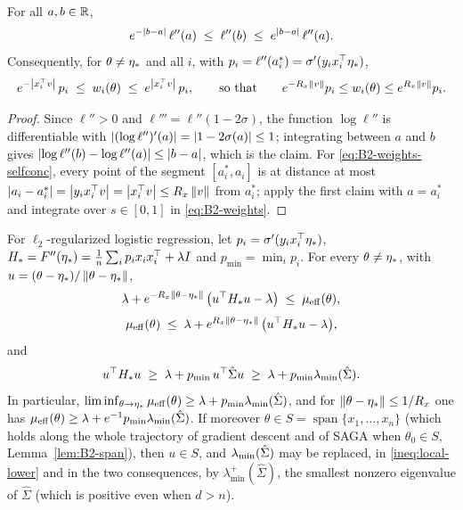 \begin{lemma}\label{lem:B2-selfconc}
For all $a,b\in\mathbb{R}$,
\[
e^{-\left|b-a\right|}\,\ell''(a)\;\le\;\ell''(b)\;\le\;e^{\left|b-a\right|}\,\ell''(a) .
\]
Consequently, for $\theta\neq\eta_\ast$ and all $i$, with $p_i=\ell''(a_i^\ast)=\sigma'(y_ix_i^\top\eta_\ast)$,
\begin{equation}\label{eq:B2-weights-selfconc}
e^{-\left|x_i^\top v\right|}\,p_i\;\le\;w_i(\theta)\;\le\;e^{\left|x_i^\top v\right|}\,p_i,
\qquad\text{so that}\qquad
e^{-R_x\left\|v\right\|}p_i\le w_i(\theta)\le e^{R_x\left\|v\right\|}p_i .
\end{equation}
\end{lemma}

\begin{proof}
Since $\ell''>0$ and $\ell'''=\ell''(1-2\sigma)$, the function $\log\ell''$ is differentiable with
$\left|(\log\ell'')'(a)\right|=\left|1-2\sigma(a)\right|\le1$; integrating between $a$ and $b$ gives
$\left|\log\ell''(b)-\log\ell''(a)\right|\le\left|b-a\right|$, which is the claim. For \eqref{eq:B2-weights-selfconc}, every point
of the segment $[a_i^\ast,a_i]$ is at distance at most $\left|a_i-a_i^\ast\right|=\left|y_ix_i^\top v\right|=\left|x_i^\top v\right|\le R_x\left\|v\right\|$
from $a_i^\ast$; apply the first claim with $a=a_i^\ast$ and integrate over $s\in[0,1]$ in \eqref{eq:B2-weights}.
\end{proof}

\begin{corollary}\label{cor:B2-local}
For $\ell_2$-regularized logistic regression, let $p_i=\sigma'(y_ix_i^\top\eta_\ast)$,
$H_\ast=F''(\eta_\ast)=\frac1n\sum_ip_ix_ix_i^\top+\lambda I$ and $p_{\min}=\min_ip_i$.
For every $\theta\neq\eta_\ast$, with $u=(\theta-\eta_\ast)/\left\|\theta-\eta_\ast\right\|$,
\begin{equation}\label{ineq:selfconc-lower}
\lambda+e^{-R_x\left\|\theta-\eta_\ast\right\|}\,\big(u^\top H_\ast u-\lambda\big)\;\le\;\mu_{\mathrm{eff}}(\theta),
\end{equation}
\begin{equation}\label{ineq:selfconc-upper}
\mu_{\mathrm{eff}}(\theta)\;\le\;\lambda+e^{R_x\left\|\theta-\eta_\ast\right\|}\,\big(u^\top H_\ast u-\lambda\big),
\end{equation}
and
\begin{equation}\label{ineq:local-lower}
u^\top H_\ast u\;\ge\;\lambda+p_{\min}\,u^\top\hat\Sigma u\;\ge\;\lambda+p_{\min}\lambda_{\min}(\hat\Sigma).
\end{equation}
In particular, $\liminf_{\theta\to\eta_\ast}\mu_{\mathrm{eff}}(\theta)\ge\lambda+p_{\min}\lambda_{\min}(\hat\Sigma)$, and for
$\left\|\theta-\eta_\ast\right\|\le1/R_x$ one has $\mu_{\mathrm{eff}}(\theta)\ge\lambda+e^{-1}p_{\min}\lambda_{\min}(\hat\Sigma)$.
If moreover $\theta\in S=\operatorname{span}\{x_1,\dots,x_n\}$ (which holds along the whole trajectory of gradient
descent and of SAGA when $\theta_0\in S$, Lemma~\ref{lem:B2-span}), then $u\in S$, and $\lambda_{\min}(\hat\Sigma)$ may be
replaced, in \eqref{ineq:local-lower} and in the two consequences, by $\lambda^+_{\min}(\hat\Sigma)$, the smallest
nonzero eigenvalue of $\hat\Sigma$ (which is positive even when $d>n$).
\end{corollary}

